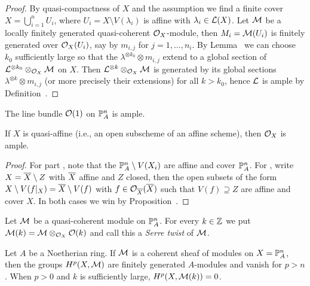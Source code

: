 \documentclass[a4paper,parskip=half,numbers=enddot, DIV=12]{scrreprt}
\begin{document}
\begin{proof}
	By quasi-compactness of $X$ and the assumption we find a finite cover $X=\bigcup_{i=1}^nU_i$, where $U_i=X\setminus V(\lambda_i)$ is affine with $\lambda_i\in \mathcal{L}(X)$. Let $\mathcal{M}$ be a locally finitely generated quasi-coherent $\mathcal{O}_X$-module, then $M_i=\mathcal{M}(U_i)$ is finitely generated over $\mathcal{O}_X(U_i)$, say by $m_{i,j}$ for $j=1,\ldots,n_i$. By Lemma~ we can choose $k_0$ sufficiently large so that the $\lambda^{\otimes k_0}\otimes m_{i,j}$ extend to a global section of $\mathcal{L}^{\otimes k_0}\otimes_{\mathcal{O}_X}\mathcal{M}$ on $X$. Then $\mathcal{L}^{\otimes k}\otimes_{\mathcal{O}_X}\mathcal{M}$ is generated by its global sections $\lambda^{\otimes k}\otimes m_{i,j}$ (or more precisely their extensions) for all $k>k_0$, hence $\mathcal{L}$ is ample by Definition~.
\end{proof}
\begin{cor}
	\begin{alphanumerate}
		\item {}The line bundle $\mathcal{O}(1)$ on $\mathbb{P}_A^n$ is ample.
		\item If $X$ is quasi-affine (i.e., an open subscheme of an affine scheme), then $\mathcal{O}_X$ is ample.
	\end{alphanumerate}
\end{cor}
\begin{proof}
	For part , note that the $\mathbb{P}_A^n\setminus V(X_i)$ are affine and cover $\mathbb{P}_A^n$. For , write $X=\overline{X}\setminus Z$ with $\overline{X}$ affine and $Z$ closed, then the open subsets of the form $X\setminus V(f|_X)=\overline{X}\setminus V(f)$ with $f\in\mathcal{O}_{\overline{X}}(\overline{X})$ such that $V(f)\supseteq Z$ are affine and cover $X$. In both cases we win by Proposition~.
\end{proof}
Let $\mathcal{M}$ be a quasi-coherent module on $\mathbb{P}_A^n$. For every $k\in \mathbb{Z}$ we put $\mathcal{M}(k)=\mathcal{M}\otimes_{\mathcal{O}_X}\mathcal{O}(k)$ and call this a \emph{Serre twist} of $\mathcal{M}$.
\begin{thm}[Serre]
	Let $A$ be a Noetherian ring. If $\mathcal{M}$ is a coherent sheaf of modules on $X=\mathbb{P}_A^n$, then the groups $H^p(X,\mathcal{M})$ are finitely generated $A$-modules and vanish for $p>n$. When $p>0$ and $k$ is sufficiently large, $H^p(X,\mathcal{M}(k))=0$.
\end{thm}
\end{document}
